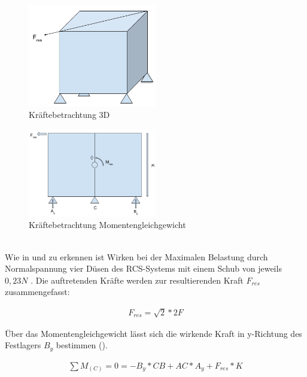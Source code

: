\begin{figure}[h]
	\centering
		\includegraphics[width=0.50\textwidth]{graphics/Gecko_Rechnung2.png}
	\caption{Kräftebetrachtung 3D}
	\label{fig:Gecko_Rechnung2}
\end{figure}

\begin{figure}[h]
	\centering
		\includegraphics[width=0.50\textwidth]{graphics/Gecko_Rechnung3.png}
	\caption{Kräftebetrachtung Momentengleichgewicht}
	\label{fig:Gecko_Rechnung3}
\end{figure}\\
Wie in  und  zu erkennen ist Wirken bei der Maximalen Belastung durch Normalspannung vier Düsen des RCS-Systems mit einem Schub von jeweils $0,23 N$ . Die auftretenden Kräfte werden zur resultierenden Kraft $F_{res}$  zusammengefasst:

	\begin{eqnarray}
			F_{res}=\sqrt{ 2 }*2F
	\end{eqnarray}

Über das Momentengleichgewicht lässt sich die wirkende Kraft in y-Richtung des Festlagers $B_y$  bestimmen ().

\begin{eqnarray}
		\sum{  }{  }{ M_{(C)} }=0=-B_y*CB+AC*A_y+F_{res}*K
\end{eqnarray}

